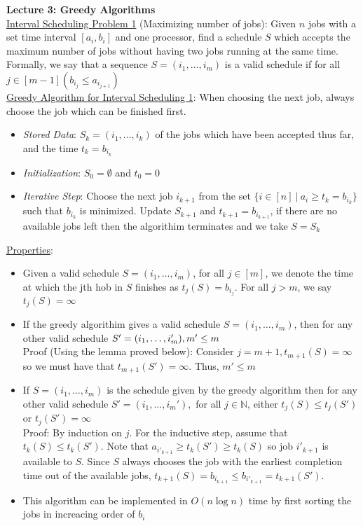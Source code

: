 \documentclass{article}
\begin{document}
\textbf{Lecture 3: Greedy Algorithms} \\[1.0ex]
\underline{Interval Scheduling Problem 1} (Maximizing number of jobs): Given $n$ jobs with a set time interval $[a_i, b_i]$ and one processor, find a schedule $S$ which accepts the maximum number of jobs without having two jobs running at the same time. Formally, we say that a sequence $S = (i_1, \dots , i_m)$ is a valid schedule if for all $j \in [m - 1](b_{i_j} \leq a_{i_{j + 1}})$ \\[1.0ex]
\underline{Greedy Algorithm for Interval Scheduling 1}: When choosing the next job, always choose the job which can be finished first.
\begin{itemize}
    \item \textit{Stored Data}: $S_k = (i_1, \dots, i_k)$ of the jobs which have been accepted thus far, and the time $t_k = b_{i_k}$
    \item \textit{Initialization}: $S_0 = \emptyset$ and $t_0 = 0$
    \item \textit{Iterative Step}: Choose the next job $i_{k + 1}$ from the set $\{i \in [n]\ |\ a_i \geq t_k = b_{i_k}\}$ such that $b_{i_k}$ is minimized. Update $S_{k + 1}$ and $t_{k + 1} = b_{i_{k + 1}}$, if there are no available jobs left then the algorithim terminates and we take $S = S_k$
\end{itemize}
\underline{Properties}: 
\begin{itemize}
    \item Given a valid schedule $S = (i_1, \dots, i_m)$, for all $j \in [m]$, we denote the time at which the jth hob in $S$ finishes as $t_j(S) = b_{i_j}$. For all $j > m$, we say $t_j(S) = \infty$
    \item If the greedy algorithim gives a valid schedule $S = (i_1, \dots, i_m)$, then for any other valid schedule $S' = (i_1, \dots, i_m'),\\ m' \leq m$ \\[0.5ex]
    Proof (Using the lemma proved below): Consider $j = m + 1, t_{m + 1} (S) = \infty$ so we must have that $t_{m + 1}(S') = \infty$. Thus, $m' \leq m$  
    \item If $S = (i_1, \dots, i_m)$ is the schedule given by the greedy algorithm then for any other valid schedule $S' = (i_1, \dots, i_m'),$ for all $j \in \mathbb{N}$, either $t_j(S) \leq t_j(S')$ or $t_j(S') = \infty$ \\[0.5ex]
    Proof: By induction on $j$. For the inductive step, assume that $t_k(S) \leq t_k(S')$. Note that $a_{i'_{k + 1}} \geq t_k(S') \geq t_k(S)$ so job $i'_{k + 1}$ is available to $S$. Since $S$ always chooses the job with the earliest completion time out of the available jobs, $t_{k + 1}(S) = b_{i_{k + 1}} \leq b_{i'_{k + 1}} = t_{k + 1}(S')$. 
    \item This algorithm can be implemented in $O(n \log n)$ time by first sorting the jobs in increacing order of $b_i$
\end{itemize}
\end{document}
